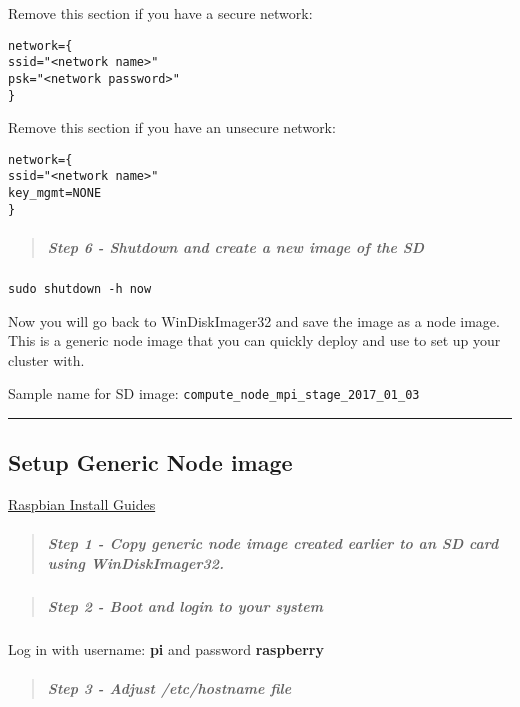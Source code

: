 \documentclass[]{article}
\let\oldsubparagraph\subparagraph
\renewcommand{\subparagraph}[1]{\oldsubparagraph{#1}\mbox{}}
\begin{document}
Remove this section if you have a secure network:

\begin{verbatim}
network={
ssid="<network name>"
psk="<network password>"
}
\end{verbatim}

Remove this section if you have an unsecure network:

\begin{verbatim}
network={
ssid="<network name>"
key_mgmt=NONE
}
\end{verbatim}

\begin{quote}
\mbox{}%
\subparagraph{Step 6 - Shutdown and create a new image of the
SD}\label{step-6---shutdown-and-create-a-new-image-of-the-sd}
\end{quote}

\texttt{sudo\ shutdown\ -h\ now}

Now you will go back to WinDiskImager32 and save the image as a node
image. This is a generic node image that you can quickly deploy and use
to set up your cluster with.

Sample name for SD image:
\texttt{compute\_node\_mpi\_stage\_2017\_01\_03}

\begin{center}\rule{0.5\linewidth}{\linethickness}\end{center}

\subsection{Setup Generic Node image}\label{setup-generic-node-image}

\href{https://www.raspberrypi.org/documentation/installation/installing-images/}{Raspbian
Install Guides}

\begin{quote}
\mbox{}%
\subparagraph{Step 1 - Copy generic node image created earlier to an SD
card using
WinDiskImager32.}\label{step-1---copy-generic-node-image-created-earlier-to-an-sd-card-using-windiskimager32.}
\end{quote}

\begin{quote}
\mbox{}%
\subparagraph{Step 2 - Boot and login to your
system}\label{step-2---boot-and-login-to-your-system}
\end{quote}

Log in with username: \textbf{pi} and password \textbf{raspberry}

\begin{quote}
\mbox{}%
\subparagraph{\texorpdfstring{Step 3 - Adjust \emph{/etc/hostname}
file}{Step 3 - Adjust /etc/hostname file}}\label{step-3---adjust-etchostname-file}
\end{quote}
\end{document}
